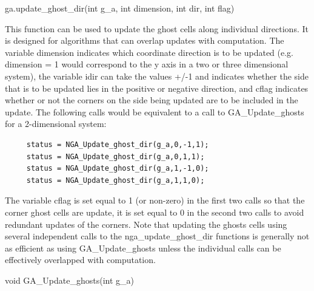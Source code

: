 \documentclass[12pt]{article}
\begin{document}
\begin{pyapi}
\begin{pycode}
ga.update_ghost_dir(int g_a, int dimension, int dir, int flag)
\end{pycode}
\begin{funcargs}
\end{funcargs}
\end{pyapi}

\gcoll

\begin{desc}

This function can be used to update the ghost cells along individual
directions. It is designed for algorithms that can overlap updates with
computation. The variable dimension indicates which coordinate direction is to
be updated (e.g. dimension = 1 would correspond to the y axis in a two or three
dimensional system), the variable idir can take the values +/-1 and indicates
whether the side that is to be updated lies in the positive or negative
direction, and cflag indicates whether or not the corners on the side being
updated are to be included in the update. The following calls would be
equivalent to a call to GA_Update_ghosts for a 2-dimensional system:

\begin{verbatim}
     status = NGA_Update_ghost_dir(g_a,0,-1,1);
     status = NGA_Update_ghost_dir(g_a,0,1,1);
     status = NGA_Update_ghost_dir(g_a,1,-1,0);
     status = NGA_Update_ghost_dir(g_a,1,1,0);
\end{verbatim}

The variable cflag is set equal to 1 (or non-zero) in the first two calls so
that the corner ghost cells are update, it is set equal to 0 in the second two
calls to avoid redundant updates of the corners. Note that updating the ghosts
cells using several independent calls to the nga_update_ghost_dir functions is
generally not as efficient as using GA_Update_ghosts unless the individual
calls can be effectively overlapped with computation.

\end{desc}


\begin{capi}
\begin{ccode}
void GA_Update_ghosts(int g_a)
\end{ccode}
\begin{funcargs}
\end{funcargs}
\end{capi}
\end{document}
